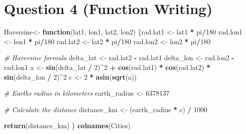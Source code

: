 \documentclass[
]{article}
\newenvironment{Shaded}{\begin{snugshade}}{\end{snugshade}}
\newcommand{\CommentTok}[1]{\textcolor[rgb]{0.56,0.35,0.01}{\textit{#1}}}
\newcommand{\ControlFlowTok}[1]{\textcolor[rgb]{0.13,0.29,0.53}{\textbf{#1}}}
\newcommand{\DecValTok}[1]{\textcolor[rgb]{0.00,0.00,0.81}{#1}}
\newcommand{\FunctionTok}[1]{\textcolor[rgb]{0.13,0.29,0.53}{\textbf{#1}}}
\newcommand{\NormalTok}[1]{#1}
\newcommand{\OtherTok}[1]{\textcolor[rgb]{0.56,0.35,0.01}{#1}}
\newcommand{\SpecialCharTok}[1]{\textcolor[rgb]{0.81,0.36,0.00}{\textbf{#1}}}
\begin{document}
\section{Question 4 (Function
Writing)}\label{question-4-function-writing}

\begin{Shaded}
\begin{Highlighting}[]
\NormalTok{ Haversine}\OtherTok{\textless{}{-}} \ControlFlowTok{function}\NormalTok{(lat1, lon1, lat2, lon2) \{rad.lat1 }\OtherTok{\textless{}{-}}\NormalTok{ lat1 }\SpecialCharTok{*}\NormalTok{ pi}\SpecialCharTok{/}\DecValTok{180}
\NormalTok{  rad.lon1 }\OtherTok{\textless{}{-}}\NormalTok{ lon1 }\SpecialCharTok{*}\NormalTok{ pi}\SpecialCharTok{/}\DecValTok{180}
\NormalTok{  rad.lat2 }\OtherTok{\textless{}{-}}\NormalTok{ lat2 }\SpecialCharTok{*}\NormalTok{ pi}\SpecialCharTok{/}\DecValTok{180}
\NormalTok{  rad.lon2 }\OtherTok{\textless{}{-}}\NormalTok{ lon2 }\SpecialCharTok{*}\NormalTok{ pi}\SpecialCharTok{/}\DecValTok{180}
  
  \CommentTok{\# Haversine formula}
\NormalTok{  delta\_lat }\OtherTok{\textless{}{-}}\NormalTok{ rad.lat2 }\SpecialCharTok{{-}}\NormalTok{ rad.lat1}
\NormalTok{  delta\_lon }\OtherTok{\textless{}{-}}\NormalTok{ rad.lon2 }\SpecialCharTok{{-}}\NormalTok{ rad.lon1}
\NormalTok{  a }\OtherTok{\textless{}{-}} \FunctionTok{sin}\NormalTok{(delta\_lat }\SpecialCharTok{/} \DecValTok{2}\NormalTok{)}\SpecialCharTok{\^{}}\DecValTok{2} \SpecialCharTok{+} \FunctionTok{cos}\NormalTok{(rad.lat1) }\SpecialCharTok{*} \FunctionTok{cos}\NormalTok{(rad.lat2) }\SpecialCharTok{*} \FunctionTok{sin}\NormalTok{(delta\_lon }\SpecialCharTok{/} \DecValTok{2}\NormalTok{)}\SpecialCharTok{\^{}}\DecValTok{2}
\NormalTok{  c }\OtherTok{\textless{}{-}} \DecValTok{2} \SpecialCharTok{*} \FunctionTok{asin}\NormalTok{(}\FunctionTok{sqrt}\NormalTok{(a))}
  
  \CommentTok{\# Earth\textquotesingle{}s radius in kilometers}
\NormalTok{  earth\_radius }\OtherTok{\textless{}{-}} \DecValTok{6378137}
  
  \CommentTok{\# Calculate the distance}
\NormalTok{  distance\_km }\OtherTok{\textless{}{-}}\NormalTok{ (earth\_radius }\SpecialCharTok{*}\NormalTok{ c) }\SpecialCharTok{/} \DecValTok{1000}
  
  \FunctionTok{return}\NormalTok{(distance\_km) }
\NormalTok{\}}
\FunctionTok{colnames}\NormalTok{(Cities)}
\end{Highlighting}
\end{Shaded}
\end{document}
